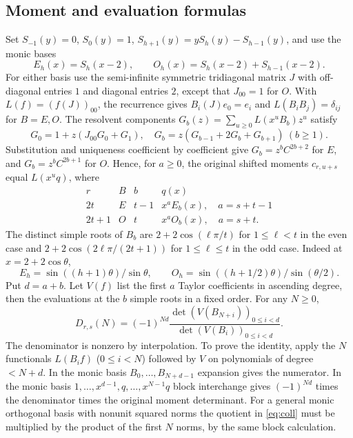 \documentclass[11pt,a4paper]{article}
\begin{document}
\subsection*{Moment and evaluation formulas}
Set $S_{-1}(y)=0$, $S_0(y)=1$, $S_{h+1}(y)=yS_h(y)-S_{h-1}(y)$, and use the monic bases
\[
 E_h(x)=S_h(x-2),\qquad O_h(x)=S_h(x-2)+S_{h-1}(x-2).
\]
For either basis use the semi-infinite symmetric tridiagonal matrix $J$ with off-diagonal entries $1$ and diagonal entries $2$, except that $J_{00}=1$ for $O$. With $L(f)=(f(J))_{00}$, the recurrence gives $B_i(J)e_0=e_i$ and $L(B_i B_j)=\delta_{ij}$ for $B=E,O$. The resolvent components $G_b(z)=\sum_{u\ge0} L(x^u B_b)z^u$ satisfy
\[
 G_0=1+z(J_{00}G_0+G_1),\quad
 G_b=z(G_{b-1}+2G_b+G_{b+1})\ (b\ge1).
\]
Substitution and uniqueness coefficient by coefficient give $G_b=z^b C^{2b+2}$ for $E$, and $G_b=z^b C^{2b+1}$ for $O$.
Hence, for $a\ge0$, the original shifted moments $c_{r,u+s}$ equal $L(x^u q)$, where
\[
 \begin{array}{c|ccc}
 r&B& b&q(x)\\\hline
 2t&E&t-1&x^a E_b(x),\quad a=s+t-1\\
 2t+1&O&t&x^a O_b(x),\quad a=s+t .
 \end{array}
\]
The distinct simple roots of $B_b$ are $2+2\cos(\ell\pi/t)$ for $1\le\ell<t$ in the even case and $2+2\cos(2\ell\pi/(2t+1))$ for $1\le\ell\le t$ in the odd case. Indeed at $x=2+2\cos\theta$,
\[
 E_h=\sin((h+1)\theta)/\sin\theta,\qquad
 O_h=\sin((h+1/2)\theta)/\sin(\theta/2).
\]
Put $d=a+b$. Let $V(f)$ list the first $a$ Taylor coefficients in ascending degree, then the evaluations at the $b$ simple roots in a fixed order. For any $N\ge0$,
\begin{equation}\label{eq:coll}
 D_{r,s}(N)=(-1)^{Nd}\frac{\det(V(B_{N+i}))_{0\le i<d}}{\det(V(B_i))_{0\le i<d}} .
\end{equation}
The denominator is nonzero by interpolation. To prove the identity, apply the $N$ functionals $L(B_i f)$ ($0\le i<N$) followed by $V$ on polynomials of degree $<N+d$. In the monic basis $B_0,\ldots,B_{N+d-1}$ expansion gives the numerator. In the monic basis $1,\ldots,x^{d-1},q,\ldots,x^{N-1}q$ block interchange gives $(-1)^{Nd}$ times the denominator times the original moment determinant. For a general monic orthogonal basis with nonunit squared norms the quotient in \eqref{eq:coll} must be multiplied by the product of the first $N$ norms, by the same block calculation.
\end{document}
